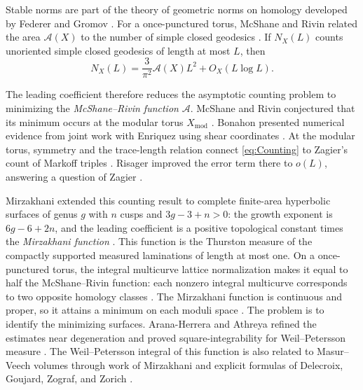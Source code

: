 \documentclass[10pt,twoside]{article}
\theoremstyle{plain}
\theoremstyle{definition}
\theoremstyle{remark}
\newcommand{\A}{\mathcal A}
\newcommand{\Xmod}{X_{\mathrm{mod}}}
\begin{document}
Stable norms are part of the theory of geometric norms on homology
developed by Federer and Gromov \cite{Federer1974,Gromov1983}.
For a once-punctured torus, McShane and Rivin related the area
$\A(X)$ to the number of simple closed geodesics
\cite{McShaneRivinNorm,McShaneRivinTori}. If $N_X(L)$
counts unoriented simple closed geodesics of length at most $L$, then
\begin{equation}\label{eq:Counting}
 N_X(L)=\frac{3}{\pi^2}\A(X)L^2+O_X(L\log L).   
\end{equation}

The leading coefficient therefore reduces the asymptotic counting
problem to minimizing the \emph{McShane--Rivin function} $\A$.
McShane and Rivin conjectured that its minimum occurs at the modular
torus $\Xmod$ \cite[Conjecture~3.4]{McShaneRivinTori}.
Bonahon presented numerical evidence from joint work with Enriquez
using shear coordinates \cite{Bonahon2018}.
At the modular torus, symmetry and the trace-length relation connect
\eqref{eq:Counting} to Zagier's count of Markoff triples
\cite{Zagier1982}. Risager improved the error term there to $o(L)$,
answering a question of Zagier \cite{Risager2026}.

Mirzakhani extended this counting result to complete finite-area
hyperbolic surfaces of genus $g$ with $n$ cusps and $3g-3+n>0$:
the growth exponent is $6g-6+2n$, and the leading coefficient
is a positive topological constant times the \emph{Mirzakhani function}
\cite{MirzakhaniGrowth}.
This function is the Thurston measure of the compactly supported
measured laminations of length at most one.
On a once-punctured torus, the integral multicurve lattice
normalization makes it equal to half the McShane--Rivin function:
each nonzero integral multicurve corresponds to two opposite
homology classes \cite{MirzakhaniGrowth}.
The Mirzakhani function is continuous and proper, so it attains a
minimum on each moduli space
\cite[Proposition~3.2 and Theorem~3.3]{MirzakhaniGrowth}.
The problem is to identify the minimizing surfaces.
Arana-Herrera and Athreya refined the estimates near degeneration
and proved square-integrability for Weil--Petersson measure
\cite{AranaHerreraAthreya}. The Weil--Petersson integral of this function is also related to Masur--Veech
volumes through work of Mirzakhani \cite{MirzakhaniEarthquake}
and explicit formulas of Delecroix, Goujard, Zograf, and Zorich
\cite{DelecroixGoujardZografZorich}. 
\end{document}
